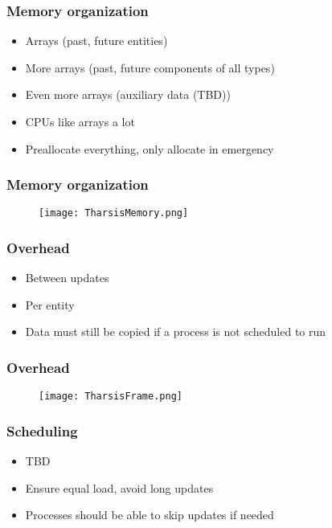 \documentclass[ignorenonframetext,]{beamer}
\begin{document}
\begin{frame}\frametitle{Memory organization}

\begin{itemize}
\item
  Arrays (past, future entities)
\item
  More arrays (past, future components of all types)
\item
  Even more arrays (auxiliary data (TBD))
\item
  CPUs like arrays a lot
\item
  Preallocate everything, only allocate in emergency
\end{itemize}

\end{frame}

\begin{frame}\frametitle{Memory organization}

\begin{figure}[h!]
\centerline{\texttt{[image: TharsisMemory.png]}}
\end{figure}

\end{frame}

\begin{frame}\frametitle{Overhead}

\begin{itemize}
\item
  Between updates
\item
  Per entity
\item
  Data must still be copied if a process is not scheduled to run
\end{itemize}

\end{frame}

\begin{frame}\frametitle{Overhead}

\begin{figure}[h!]
\centerline{\texttt{[image: TharsisFrame.png]}}
\end{figure}

\end{frame}

\begin{frame}\frametitle{Scheduling}

\begin{itemize}
\item
  TBD
\item
  Ensure equal load, avoid long updates
\item
  Processes should be able to skip updates if needed
\end{itemize}

\end{frame}
\end{document}
